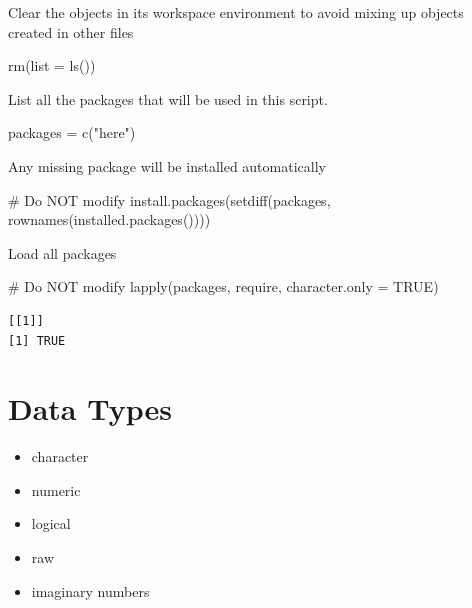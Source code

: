 \documentclass[
  letterpaper,
  DIV=11,
  numbers=noendperiod]{scrreprt}
\newenvironment{Shaded}{\begin{snugshade}}{\end{snugshade}}
\newcommand{\AttributeTok}[1]{\textcolor[rgb]{0.40,0.45,0.13}{#1}}
\newcommand{\CommentTok}[1]{\textcolor[rgb]{0.37,0.37,0.37}{#1}}
\newcommand{\ConstantTok}[1]{\textcolor[rgb]{0.56,0.35,0.01}{#1}}
\newcommand{\FunctionTok}[1]{\textcolor[rgb]{0.28,0.35,0.67}{#1}}
\newcommand{\NormalTok}[1]{\textcolor[rgb]{0.00,0.23,0.31}{#1}}
\newcommand{\OtherTok}[1]{\textcolor[rgb]{0.00,0.23,0.31}{#1}}
\newcommand{\StringTok}[1]{\textcolor[rgb]{0.13,0.47,0.30}{#1}}
\providecommand{\tightlist}{%
  \setlength{\itemsep}{0pt}\setlength{\parskip}{0pt}}\usepackage{longtable,booktabs,array}
\begin{document}
Clear the objects in its workspace environment to avoid mixing up
objects created in other files

\begin{Shaded}
\begin{Highlighting}[]
\FunctionTok{rm}\NormalTok{(}\AttributeTok{list =} \FunctionTok{ls}\NormalTok{())}
\end{Highlighting}
\end{Shaded}

List all the packages that will be used in this script.

\begin{Shaded}
\begin{Highlighting}[]
\NormalTok{packages }\OtherTok{=} \FunctionTok{c}\NormalTok{(}\StringTok{"here"}\NormalTok{)}
\end{Highlighting}
\end{Shaded}

Any missing package will be installed automatically

\begin{Shaded}
\begin{Highlighting}[]
\CommentTok{\# Do NOT modify}
\FunctionTok{install.packages}\NormalTok{(}\FunctionTok{setdiff}\NormalTok{(packages, }\FunctionTok{rownames}\NormalTok{(}\FunctionTok{installed.packages}\NormalTok{())))}
\end{Highlighting}
\end{Shaded}

Load all packages

\begin{Shaded}
\begin{Highlighting}[]
\CommentTok{\# Do NOT modify}
\FunctionTok{lapply}\NormalTok{(packages, require, }\AttributeTok{character.only =} \ConstantTok{TRUE}\NormalTok{)}
\end{Highlighting}
\end{Shaded}

\begin{verbatim}
[[1]]
[1] TRUE
\end{verbatim}

\section{Data Types}\label{data-types}

\begin{itemize}
\tightlist
\item
  character
\item
  numeric
\item
  logical
\item
  raw
\item
  imaginary numbers
\end{itemize}
\end{document}
